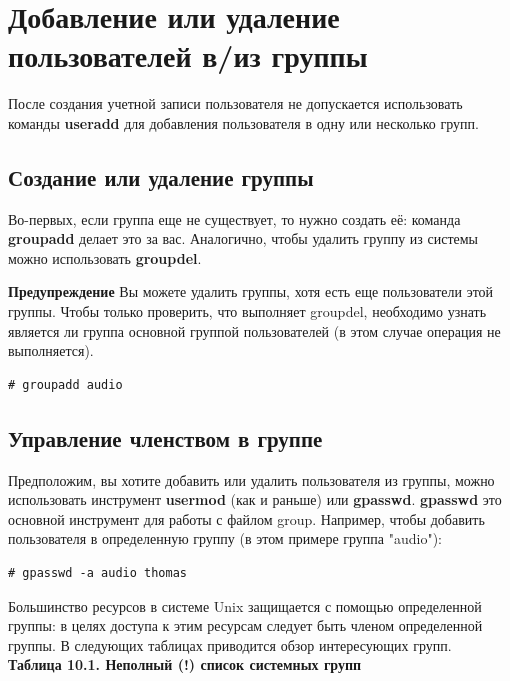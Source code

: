 \documentclass[10pt]{book}
\begin{document}
\section{Добавление или удаление пользователей в/из группы}
После создания учетной записи пользователя не допускается использовать команды \textbf{useradd} для добавления пользователя в одну или несколько групп.

\subsection{Создание или удаление группы}
Во-первых, если группа еще не существует, то нужно создать её: команда \textbf{groupadd} делает это за вас. Аналогично, чтобы удалить группу из системы можно использовать \textbf{groupdel}.

\textbf{Предупреждение}
Вы можете удалить группы, хотя есть еще пользователи этой группы.
Чтобы только проверить, что выполняет groupdel, необходимо узнать является ли группа основной группой пользователей (в этом случае операция не выполняется).
\begin{tcolorbox}
\begin{lstlisting}
# groupadd audio
\end{lstlisting}
\end{tcolorbox}

\subsection{Управление членством в группе}
Предположим, вы хотите добавить или удалить пользователя из группы, можно использовать инструмент \textbf{usermod} (как и раньше) или \textbf{gpasswd}.
\textbf{gpasswd} это основной инструмент для работы с файлом group. Например, чтобы добавить пользователя в определенную группу (в этом примере группа "audio"):
\begin{tcolorbox}
\begin{lstlisting}
# gpasswd -a audio thomas
\end{lstlisting}
\end{tcolorbox}
Большинство ресурсов в системе Unix защищается с помощью определенной группы: в целях доступа к этим ресурсам следует быть членом определенной группы. В следующих таблицах приводится обзор интересующих групп.\\

\textbf{Таблица 10.1. Неполный (!) список системных групп}\\
\end{document}
